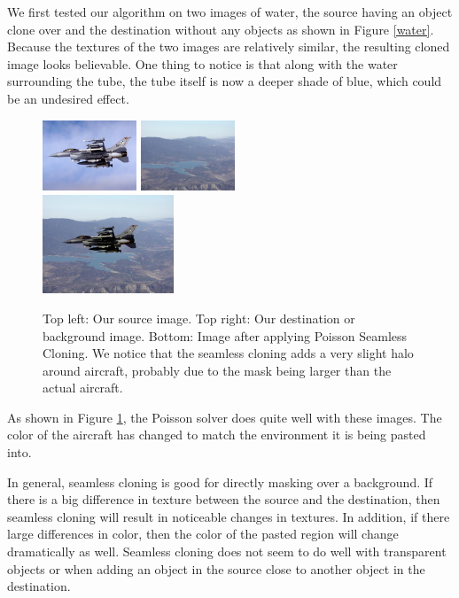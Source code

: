 \documentclass[12pt]{article}
\begin{document}
We first tested our algorithm on two images of water, the source having an object clone over and the destination without any objects as shown in Figure \ref{water}. Because the textures of the two images are relatively similar, the resulting cloned image looks believable. One thing to notice is that along with the water surrounding the tube, the tube itself is now a deeper shade of blue, which could be an undesired effect.

\noindent\begin{figure}[H]
\centering
\includegraphics[width=0.25\textwidth,keepaspectratio]{data/SeamlessCloning/f16/F16Source.jpg}
\includegraphics[width=0.25\textwidth,keepaspectratio]{data/SeamlessCloning/f16/F16Target.jpg}\\
\includegraphics[width=0.35\textwidth,keepaspectratio]{data/SeamlessCloning/f16/cloned.jpg}
\caption{Top left: Our source image. Top right: Our destination or background image. Bottom: Image after applying Poisson Seamless Cloning. We notice that the seamless cloning adds a very slight halo around aircraft, probably due to the mask being larger than the actual aircraft.}
\label{f16}
\end{figure}

As shown in Figure \ref{f16}, the Poisson solver does quite well with these images. The color of the aircraft has changed to match the environment it is being pasted into.

In general, seamless cloning is good for directly masking over a background. If there is a big difference in texture between the source and the destination, then seamless cloning will result in noticeable changes in textures. In addition, if there large differences in color, then the color of the pasted region will change dramatically as well. Seamless cloning does not seem to do well with transparent objects or when adding an object in the source close to another object in the destination.
\end{document}
